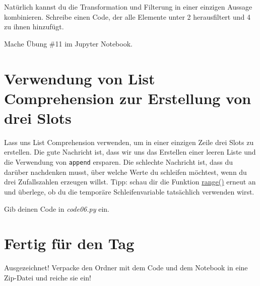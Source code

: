 \documentclass[
]{book}
\begin{document}
Natürlich kannst du die Transformation und Filterung in einer einzigen Aussage kombinieren. Schreibe einen Code, der alle Elemente unter 2 herausfiltert und 4 zu ihnen hinzufügt.

Mache Übung \#11 im Jupyter Notebook.

\hypertarget{verwendung-von-list-comprehension-zur-erstellung-von-drei-slots}{%
\section{Verwendung von List Comprehension zur Erstellung von drei Slots}\label{verwendung-von-list-comprehension-zur-erstellung-von-drei-slots}}

Lass uns List Comprehension verwenden, um in einer einzigen Zeile drei Slots zu erstellen. Die gute Nachricht ist, dass wir uns das Erstellen einer leeren Liste und die Verwendung von \texttt{append} ersparen. Die schlechte Nachricht ist, dass du darüber nachdenken musst, über welche Werte du schleifen möchtest, wenn du drei Zufallszahlen erzeugen willst. Tipp: schau dir die Funktion \protect\hyperlink{range}{range()} erneut an und überlege, ob du die temporäre Schleifenvariable tatsächlich verwenden wirst.

Gib deinen Code in \emph{code06.py} ein.

\hypertarget{fertig-fuxfcr-den-tag}{%
\section{Fertig für den Tag}\label{fertig-fuxfcr-den-tag}}

Ausgezeichnet! Verpacke den Ordner mit dem Code und dem Notebook in eine Zip-Datei und reiche sie ein!

  
\end{document}

